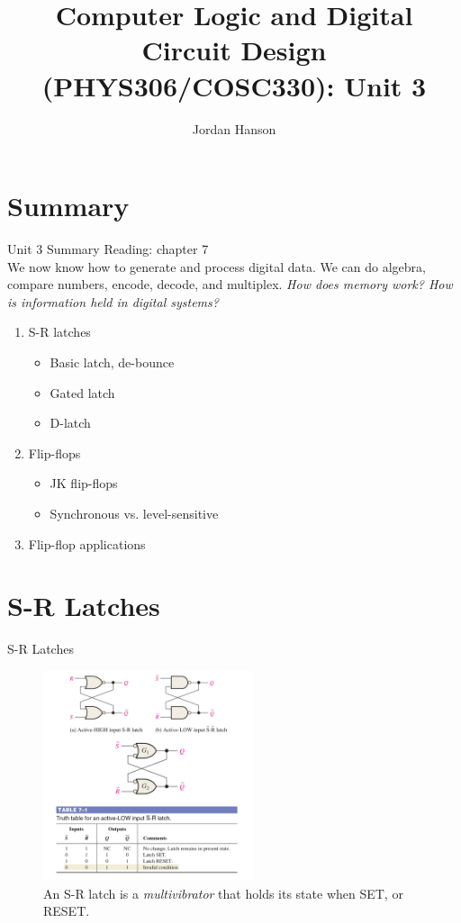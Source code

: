 \documentclass{beamer}
\title{Computer Logic and Digital Circuit Design (PHYS306/COSC330): Unit 3}
\author{Jordan Hanson}
\institute{Whittier College Department of Physics and Astronomy}
\begin{document}
\maketitle

\section{Summary}

\begin{frame}{Unit 3 Summary}
\alert{Reading: chapter 7} \\
We now know how to generate and process digital data. We can do algebra, compare numbers, encode, decode, and multiplex.  \textit{How does memory work?  How is information held in digital systems?}
\begin{enumerate}
\item S-R latches
\begin{itemize}
\item Basic latch, de-bounce
\item Gated latch
\item D-latch
\end{itemize}
\item Flip-flops
\begin{itemize}
\item JK flip-flops
\item Synchronous vs. level-sensitive
\end{itemize}
\item Flip-flop applications
\end{enumerate}
\end{frame}
\section{S-R Latches}

\begin{frame}{S-R Latches}
\begin{figure}
\centering
\includegraphics[width=0.55\textwidth]{figures/SR1.pdf}
\caption{\label{fig:sr1} An S-R latch is a \textit{multivibrator} that holds its state when SET, or RESET.}
\end{figure}
\end{frame}
\end{document}
